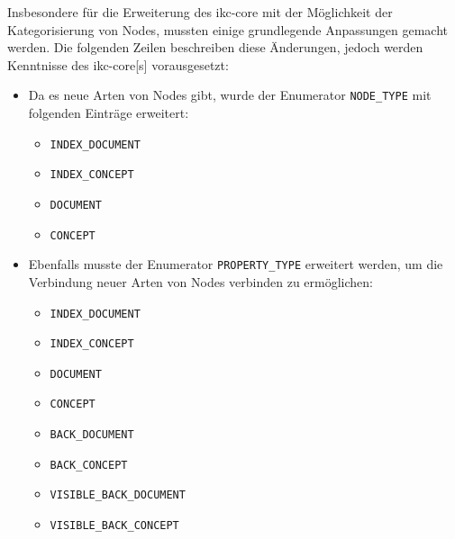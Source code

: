 
Insbesondere für die Erweiterung des \gls{ikc-core} mit der Möglichkeit der Kategorisierung von Nodes, mussten einige grundlegende Anpassungen gemacht werden. Die folgenden Zeilen beschreiben diese Änderungen, jedoch werden Kenntnisse des \gls{ikc-core}[s] vorausgesetzt:
\begin{itemize}
    \item Da es neue Arten von Nodes gibt, wurde der Enumerator \verb|NODE_TYPE| mit folgenden Einträge erweitert:
    \begin{itemize}
        \item \verb|INDEX_DOCUMENT|\\
        \item \verb|INDEX_CONCEPT|\\
        \item \verb|DOCUMENT|\\
        \item \verb|CONCEPT|\\
    \end{itemize}
    \item Ebenfalls musste der Enumerator \verb|PROPERTY_TYPE| erweitert werden, um die Verbindung neuer Arten von Nodes verbinden zu ermöglichen:
    \begin{itemize}
        \item \verb|INDEX_DOCUMENT|\\
        \item \verb|INDEX_CONCEPT|\\
        \item \verb|DOCUMENT|\\
        \item \verb|CONCEPT|\\
        \item \verb|BACK_DOCUMENT|\\
        \item \verb|BACK_CONCEPT|\\
        \item \verb|VISIBLE_BACK_DOCUMENT|\\
        \item \verb|VISIBLE_BACK_CONCEPT|\\
    \end{itemize}    
\end{itemize}




